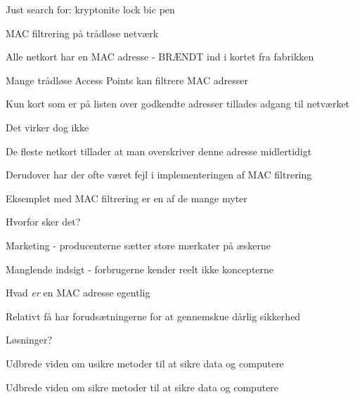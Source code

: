 \documentclass[20pt,landscape,a4paper]{foils}
\begin{document}


\begin{list1}
\item Just search for: kryptonite lock bic pen
\item {}
\end{list1}




\begin{list1}
\item MAC filtrering på trådløse netværk
\item Alle netkort har en MAC adresse - BRÆNDT ind i kortet fra fabrikken
\item Mange trådløse Access Points kan filtrere MAC adresser
\item Kun kort som er på listen over godkendte adresser tillades adgang til netværket
\pause
\item Det virker dog ikke \smiley
\item De fleste netkort tillader at man overskriver denne adresse midlertidigt
\item Derudover har der ofte været fejl i implementeringen af MAC filtrering
\end{list1}


\begin{list1}
\item Eksemplet med MAC filtrering er en af de mange myter
\item Hvorfor sker det?
\item Marketing - producenterne sætter store mærkater på æskerne
\item Manglende indsigt - forbrugerne kender reelt ikke koncepterne
\item Hvad \emph{er} en MAC adresse egentlig
\item Relativt få har forudsætningerne for at gennemskue dårlig sikkerhed
\item Løsninger?
\pause
\item Udbrede viden om usikre metoder til at sikre data og computere
\item Udbrede viden om sikre metoder til at sikre data og computere
\end{list1}

\end{document}
